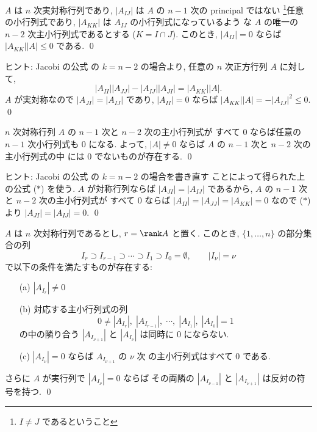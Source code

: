 \documentclass[12pt,twoside]{jarticle}
\begin{document}
\begin{question}
\label{q:Jacobi-identity-2}
  $A$ は $n$ 次実対称行列であり, 
  $|A_{IJ}|$ は $A$ の $n-1$ 次の principal ではない%
  \footnote{$I\ne J$ であるということ}任意の小行列式であり,
  $|A_{KK}|$ は $A_{IJ}$ の小行列式になっているよう
  な $A$ の唯一の $n-2$ 次主小行列式であるとする ($K=I\cap J$).
  このとき, $|A_{II}|=0$ ならば $|A_{KK}||A|\le 0$ である.
  \qed
\end{question}

\noindent
ヒント: Jacobi の公式  の $k=n-2$ の場合より, 
任意の $n$ 次正方行列 $A$ に対して,
\begin{equation*}
  |A_{II}||A_{JJ}| - |A_{IJ}||A_{JI}| = |A_{KK}||A|.
  \tag{$*$}
\end{equation*}
$A$ が実対称なので $|A_{JI}|=|A_{IJ}|$ であり, 
$|A_{II}|=0$ ならば $|A_{KK}||A|=-|A_{IJ}|^2\le 0$.
\qed


\begin{question}
\label{q:Jacobi-identity-3}
  $n$ 次対称行列 $A$ の $n-1$ 次と $n-2$ 次の主小行列式が
  すべて $0$ ならば任意の $n-1$ 次小行列式も $0$ になる. 
  よって, $|A|\ne 0$ ならば $A$ の $n-1$ 次と $n-2$ 次の主小行列式の中
  には $0$ でないものが存在する.
  \qed
\end{question}

\noindent
ヒント: Jacobi の公式  の $k=n-2$ の場合を書き直す
ことによって得られた上の公式 ($*$) を使う.  
$A$ が対称行列ならば $|A_{JI}|=|A_{IJ}|$ であるから,
$A$ の $n-1$ 次と $n-2$ 次の主小行列式が
すべて $0$ ならば $|A_{II}|=|A_{JJ}|=|A_{KK}|=0$ 
なので ($*$) より $|A_{JI}|=|A_{IJ}|=0$.
\qed


\begin{question}
\label{q:takagi-theorem9.5}
  $A$ は $n$ 次対称行列であるとし, $r = \rank A$ と置く. 
  このとき, $\{1,\dots,n\}$ の部分集合の列
  \begin{equation*}
    I_r\supset I_{r-1}\supset\cdots\supset I_1\supset I_0=\emptyset,
    \qquad |I_\nu|=\nu
  \end{equation*}
  で以下の条件を満たすものが存在する:
  \begin{enumerate}
  \item[(a)] $|A_{I_r}|\ne 0$
  \item[(b)] 対応する主小行列式の列
    \begin{equation*}
      0\ne|A_{I_r}|,\; |A_{I_{r-1}}|,\; \cdots,\; |A_{I_1}|,\; |A_{I_0}|=1
    \end{equation*}
    の中の隣り合う $|A_{I_{\nu+1}}|$ と $|A_{I_\nu}|$ は同時に $0$ にならない.
  \item[(c)] $|A_{I_\nu}|=0$ ならば $A_{I_{\nu+1}}$ の $\nu$ 次
    の主小行列式はすべて $0$ である.
  \end{enumerate}
  さらに $A$ が実行列で $|A_{I_\nu}|=0$ ならば 
  その両隣の $|A_{I_{\nu-1}}|$ と $|A_{I_{\nu+1}}|$ は反対の符号を持つ.
  \qed
\end{question}
\end{document}
